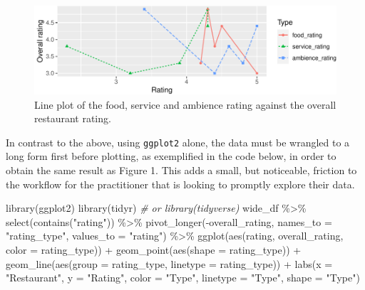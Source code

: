 \documentclass[10pt,a4paper,onecolumn]{article}
\newenvironment{Shaded}{\begin{snugshade}}{\end{snugshade}}
\newcommand{\AttributeTok}[1]{\textcolor[rgb]{0.77,0.63,0.00}{#1}}
\newcommand{\CommentTok}[1]{\textcolor[rgb]{0.56,0.35,0.01}{\textit{#1}}}
\newcommand{\FunctionTok}[1]{\textcolor[rgb]{0.00,0.00,0.00}{#1}}
\newcommand{\NormalTok}[1]{#1}
\newcommand{\SpecialCharTok}[1]{\textcolor[rgb]{0.00,0.00,0.00}{#1}}
\newcommand{\StringTok}[1]{\textcolor[rgb]{0.31,0.60,0.02}{#1}}
\begin{document}
\begin{figure}
\centering
\includegraphics{paper_files/figure-latex/matplot2-1.pdf}
\caption{Line plot of the food, service and ambience rating against the
overall restaurant rating.}
\end{figure}

In contrast to the above, using \texttt{ggplot2} alone, the data must be
wrangled to a long form first before plotting, as exemplified in the
code below, in order to obtain the same result as Figure 1. This adds a
small, but noticeable, friction to the workflow for the practitioner
that is looking to promptly explore their data.

\begin{Shaded}
\begin{Highlighting}[]
\FunctionTok{library}\NormalTok{(ggplot2)}
\FunctionTok{library}\NormalTok{(tidyr) }\CommentTok{\# or library(tidyverse)}
\NormalTok{wide\_df }\SpecialCharTok{\%\textgreater{}\%} 
  \FunctionTok{select}\NormalTok{(}\FunctionTok{contains}\NormalTok{(}\StringTok{"rating"}\NormalTok{)) }\SpecialCharTok{\%\textgreater{}\%} 
  \FunctionTok{pivot\_longer}\NormalTok{(}\SpecialCharTok{{-}}\NormalTok{overall\_rating, }
               \AttributeTok{names\_to =} \StringTok{"rating\_type"}\NormalTok{,}
               \AttributeTok{values\_to =} \StringTok{"rating"}\NormalTok{) }\SpecialCharTok{\%\textgreater{}\%} 
  \FunctionTok{ggplot}\NormalTok{(}\FunctionTok{aes}\NormalTok{(rating, overall\_rating, }\AttributeTok{color =}\NormalTok{ rating\_type)) }\SpecialCharTok{+} 
  \FunctionTok{geom\_point}\NormalTok{(}\FunctionTok{aes}\NormalTok{(}\AttributeTok{shape =}\NormalTok{ rating\_type)) }\SpecialCharTok{+}
  \FunctionTok{geom\_line}\NormalTok{(}\FunctionTok{aes}\NormalTok{(}\AttributeTok{group =}\NormalTok{ rating\_type, }\AttributeTok{linetype =}\NormalTok{ rating\_type)) }\SpecialCharTok{+}
  \FunctionTok{labs}\NormalTok{(}\AttributeTok{x =} \StringTok{"Restaurant"}\NormalTok{, }\AttributeTok{y =} \StringTok{"Rating"}\NormalTok{, }
       \AttributeTok{color =} \StringTok{"Type"}\NormalTok{, }\AttributeTok{linetype =} \StringTok{"Type"}\NormalTok{, }\AttributeTok{shape =} \StringTok{"Type"}\NormalTok{)}
\end{Highlighting}
\end{Shaded}
\end{document}

